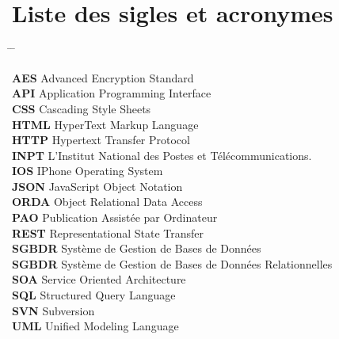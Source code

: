 \chapter{Liste des sigles et acronymes}




\begin{tabbing}
    \hspace{3cm} \= \hspace{7cm} \= \kill

    \textbf{AES} \>  Advanced Encryption Standard \\

    \textbf{API} \> Application Programming Interface \\

    \textbf{CSS} \> Cascading Style Sheets \\

    \textbf{HTML} \> HyperText Markup Language \\

    \textbf{HTTP} \> Hypertext Transfer Protocol \\

    \textbf{INPT} \> L'Institut National des Postes et Télécommunications. \\
 
    \textbf{IOS} \> IPhone Operating System \\

    \textbf{JSON} \> JavaScript Object Notation \\

    \textbf{ORDA} \> Object Relational Data Access \\

    \textbf{PAO} \> Publication Assistée par Ordinateur \\

    \textbf{REST} \> Representational State Transfer \\
 
    \textbf{SGBDR} \> Système de Gestion de Bases de Données \\

    \textbf{SGBDR} \> Système de Gestion de Bases de Données Relationnelles \\
    
    \textbf{SOA} \> Service Oriented Architecture \\

    \textbf{SQL} \> Structured Query Language \\

    \textbf{SVN} \> Subversion \\

    \textbf{UML} \> Unified Modeling Language \\
    
\end{tabbing}
